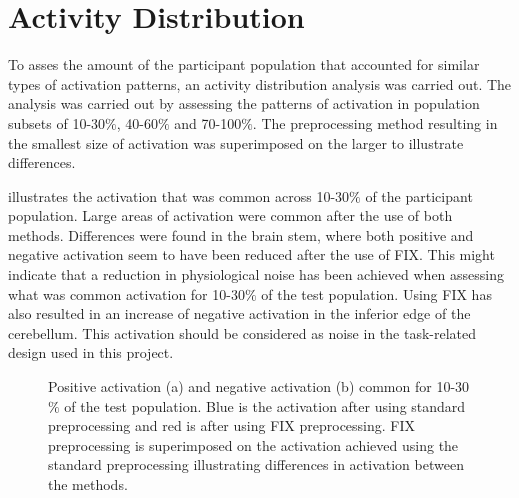 \section{Activity Distribution}

To asses the amount of the participant population that accounted for similar types of activation patterns, an activity distribution analysis was carried out. The analysis was carried out by assessing the patterns of activation in population subsets of 10-30$\percent$, 40-60$\percent$ and 70-100$\percent$. The preprocessing method resulting in the smallest size of activation was superimposed on the larger to illustrate differences.  

 illustrates the activation that was common across 10-30$\percent$ of the participant population. Large areas of activation were common after the use of both methods. Differences were found in the brain stem, where both positive and negative activation seem to have been reduced after the use of FIX. This might indicate that a reduction in physiological noise has been achieved when assessing what was common activation for 10-30$\percent$ of the test population. Using FIX has also resulted in an increase of negative activation in the inferior edge of the cerebellum. This activation should be considered as noise in the task-related design used in this project.

\begin{figure}[H]%
	\centering
	\qquad
	\caption{Positive activation (a) and negative activation (b) common for 10-30$\percent$ of the test population. Blue is the activation after using standard preprocessing and red is after using FIX preprocessing. FIX preprocessing is superimposed on the activation achieved using the standard preprocessing illustrating differences in activation between the methods.}
	\label{fig:10}
\end{figure}


